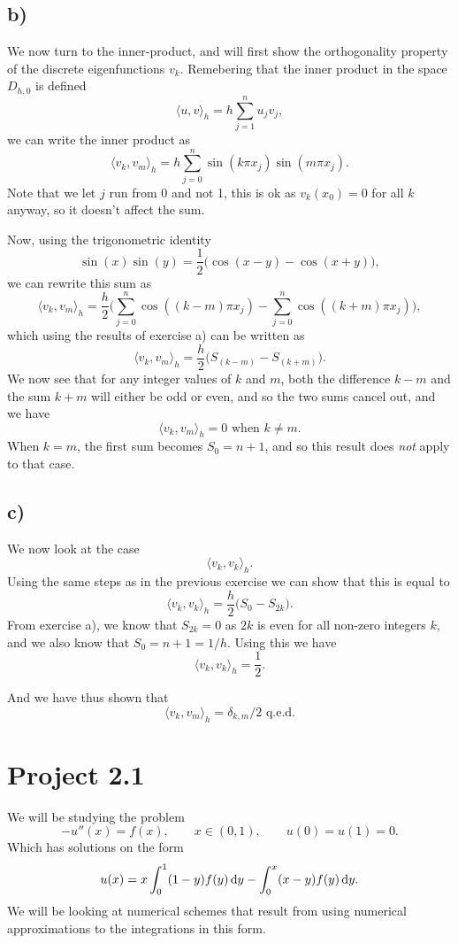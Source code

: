 \documentclass[a4paper, 11pt, notitlepage, english]{article}
\renewcommand{\d}{{\rm d}}
\begin{document}
\subsection*{b)}
We now turn to the inner-product, and will first show the orthogonality property of the discrete eigenfunctions $v_k$. Remebering that the inner product in the space $D_{h,0}$ is defined
$$\langle u,v\rangle_h = h\sum_{j=1}^n u_j v_j,$$
we can write the inner product as
$$\langle v_k, v_m \rangle_h = h\sum_{j=0}^n \sin(k\pi x_j)\sin(m\pi x_j).$$
Note that we let $j$ run from 0 and not 1, this is ok as $v_k(x_0) = 0$ for all $k$ anyway, so it doesn't affect the sum. 

Now, using the trigonometric identity
$$\sin(x)\sin(y) = \frac{1}{2}\big(\cos(x-y) - \cos(x+y)\big),$$
we can rewrite this sum as
$$\langle v_k, v_m \rangle_h = \frac{h}{2}\bigg(\sum_{j=0}^n \cos((k-m)\pi x_j) - \sum_{j=0}^n \cos((k+m)\pi x_j)\bigg),$$
which using the results of exercise a) can be written as
$$\langle v_k, v_m \rangle_h = \frac{h}{2}\bigg(S_{(k-m)} - S_{(k+m)}\bigg).$$
We now see that for any integer values of $k$ and $m$, both the difference $k-m$ and the sum $k+m$ will either be odd or even, and so the two sums cancel out, and we have
$$\langle v_k, v_m \rangle_h = 0 \mbox{ when }k\neq m.$$
When $k=m$, the first sum becomes $S_0 = n+1$, and so this result does \emph{not} apply to that case.

\subsection*{c)}
We now look at the case
$$\langle v_k, v_k \rangle_h.$$
Using the same steps as in the previous exercise we can show that this is equal to
$$\langle v_k, v_k \rangle_h = \frac{h}{2}\bigg(S_0 - S_{2k}\bigg).$$
From exercise a), we know that $S_{2k} = 0$ as $2k$ is even for all non-zero integers $k$, and we also know that $S_0 = n+1 = 1/h.$ Using this we have
$$\langle v_k, v_k \rangle_h = \frac{1}{2}.$$

And we have thus shown that
$$\langle v_k, v_m \rangle_h = \delta_{k,m}/2 \mbox{ q.e.d.}$$

\clearpage


\section*{Project 2.1}

We will be studying the problem
$$-u''(x) = f(x), \qquad x \in (0,1), \qquad u(0)=u(1)=0.$$
Which has solutions on the form
$$u(x) = x\int_0^1 (1-y)f(y)\, \d y - \int_0^x (x-y)f(y)\, \d y.$$
We will be looking at numerical schemes that result from using numerical approximations to the integrations in this form.
\end{document}
